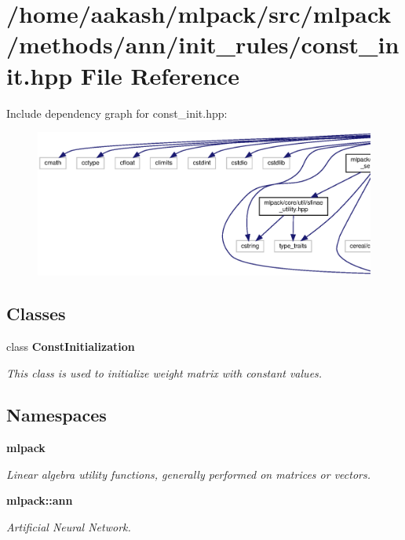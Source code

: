 \section{/home/aakash/mlpack/src/mlpack/methods/ann/init\+\_\+rules/const\+\_\+init.hpp File Reference}
\label{const__init_8hpp}
Include dependency graph for const\+\_\+init.\+hpp\+:
\nopagebreak
\begin{figure}[H]
\begin{center}
\leavevmode
\includegraphics[width=350pt]{const__init_8hpp__incl}
\end{center}
\end{figure}
\subsection*{Classes}
\begin{DoxyCompactItemize}
\item 
class \textbf{ Const\+Initialization}
\begin{DoxyCompactList}\small\item\em This class is used to initialize weight matrix with constant values. \end{DoxyCompactList}\end{DoxyCompactItemize}
\subsection*{Namespaces}
\begin{DoxyCompactItemize}
\item 
 \textbf{ mlpack}
\begin{DoxyCompactList}\small\item\em Linear algebra utility functions, generally performed on matrices or vectors. \end{DoxyCompactList}\item 
 \textbf{ mlpack\+::ann}
\begin{DoxyCompactList}\small\item\em Artificial Neural Network. \end{DoxyCompactList}\end{DoxyCompactItemize}



